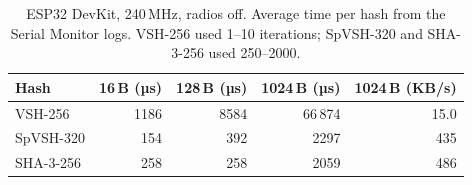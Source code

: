 \begin{table}[ht]
\caption{ESP32 DevKit, 240\,MHz, radios off. Average time per hash from the Serial Monitor logs. VSH-256 used 1--10 iterations; SpVSH-320 and SHA-3-256 used 250--2000.}
\label{tab:esp32-latency}
\centering
\begin{tabular}{@{}lrrrr@{}}
\toprule
Hash & 16\,B (µs) & 128\,B (µs) & 1024\,B (µs) & 1024\,B (KB/s) \\
\midrule
VSH-256 & 1186 & 8584 & 66\,874 & 15.0 \\
SpVSH-320 & 154 & 392 & 2297 & 435 \\
SHA-3-256 & 258 & 258 & 2059 & 486 \\
\bottomrule
\end{tabular}
\end{table}
